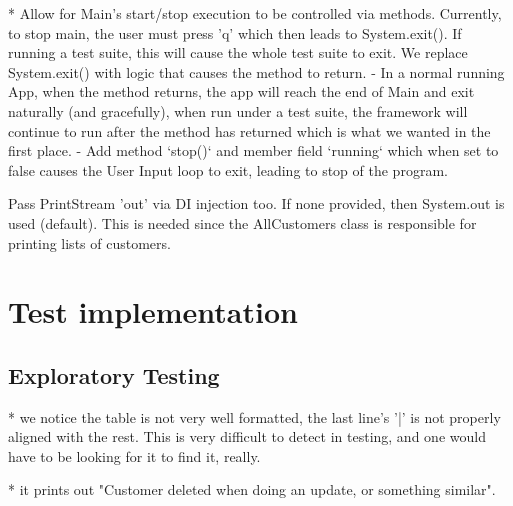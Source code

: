 
* Allow for Main's start/stop execution to be controlled via methods. Currently, to stop main, the user must press 'q' which then leads to System.exit(). If running a test suite, this will cause the whole test suite to exit. We replace System.exit() with logic that causes the method to return. 
 -	In a normal running App,   when the method returns, the app will reach the end of Main and exit naturally (and gracefully), when run under a test suite, the framework will continue to run after the method has returned which is what we wanted in the first place. 
  - Add method `stop()` and member field `running` which when set to false causes the User Input loop to exit, leading to stop of the program.





Pass PrintStream 'out' via DI injection too. If none provided, then System.out is used (default). This is needed since the AllCustomers class is responsible for printing lists of customers.  


\section{Test implementation}

\subsection{Exploratory Testing}

* we notice the table is not very well formatted, the last line's '|' is not properly aligned with the rest. This is very difficult to detect in testing, and one would have to be looking for it to find it, really. 

* it prints out "Customer deleted when doing an update, or something similar". 
